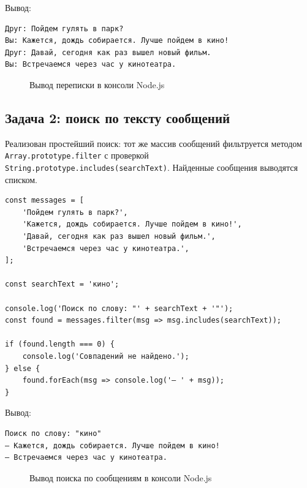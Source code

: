 Вывод:

\begin{lstlisting}
Друг: Пойдем гулять в парк?
Вы: Кажется, дождь собирается. Лучше пойдем в кино!
Друг: Давай, сегодня как раз вышел новый фильм.
Вы: Встречаемся через час у кинотеатра.
\end{lstlisting}

\begin{figure}[h]
  \centering
  \caption{Вывод переписки в консоли Node.js}
  \label{fig:les2_task1}
\end{figure}

\subsection{Задача 2: поиск по тексту сообщений}

Реализован простейший поиск: тот же массив сообщений фильтруется
методом \texttt{Array.prototype.filter} с проверкой
\texttt{String.prototype.includes(searchText)}. Найденные сообщения
выводятся списком.

\begin{lstlisting}[caption={\texttt{les-2/task2.js} --- поиск через \texttt{includes}},captionpos=b]
const messages = [
    'Пойдем гулять в парк?',
    'Кажется, дождь собирается. Лучше пойдем в кино!',
    'Давай, сегодня как раз вышел новый фильм.',
    'Встречаемся через час у кинотеатра.',
];

const searchText = 'кино';

console.log('Поиск по слову: "' + searchText + '"');
const found = messages.filter(msg => msg.includes(searchText));

if (found.length === 0) {
    console.log('Совпадений не найдено.');
} else {
    found.forEach(msg => console.log('— ' + msg));
}
\end{lstlisting}

Вывод:

\begin{lstlisting}
Поиск по слову: "кино"
— Кажется, дождь собирается. Лучше пойдем в кино!
— Встречаемся через час у кинотеатра.
\end{lstlisting}

\begin{figure}[h]
  \centering
  \caption{Вывод поиска по сообщениям в консоли Node.js}
  \label{fig:les2_task2}
\end{figure}

